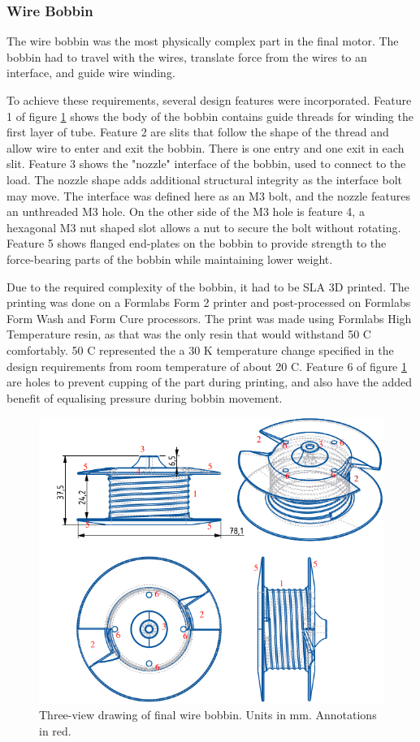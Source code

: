 \documentclass[a4paper,12pt]{article}
\begin{document}
\subsubsection{Wire Bobbin}

The wire bobbin was the most physically complex part in the final motor. The bobbin had to travel with the wires, translate force from the wires to an interface, and guide wire winding.

To achieve these requirements, several design features were incorporated. Feature 1 of figure \ref{fg:bobbin} shows the body of the bobbin contains guide threads for winding the first layer of tube. Feature 2 are slits that follow the shape of the thread and allow wire to enter and exit the bobbin. There is one entry and one exit in each slit. Feature 3 shows the "nozzle" interface of the bobbin, used to connect to the load. The nozzle shape adds additional structural integrity as the interface bolt may move. The interface was defined here as an M3 bolt, and the nozzle features an unthreaded M3 hole. On the other side of the M3 hole is feature 4, a hexagonal M3 nut shaped slot allows a nut to secure the bolt without rotating. Feature 5 shows flanged end-plates on the bobbin to provide strength to the force-bearing parts of the bobbin while maintaining lower weight.

Due to the required complexity of the bobbin, it had to be SLA 3D printed. The printing was done on a Formlabs Form 2 printer and post-processed on Formlabs Form Wash and Form Cure processors. The print was made using Formlabs High Temperature resin, as that was the only resin that would withstand 50 \degree C comfortably. 50 \degree C represented the a 30 K temperature change specified in the design requirements from room temperature of about 20 \degree C. Feature 6 of figure \ref{fg:bobbin} are holes to prevent cupping of the part during printing, and also have the added benefit of equalising pressure during bobbin movement.

\begin{figure}[h!]
    \centering
    \includegraphics[scale=0.5]{bobbin.png}
    \caption{Three-view drawing of final wire bobbin. Units in mm. Annotations in red.}
    \label{fg:bobbin}
\end{figure}
\end{document}
